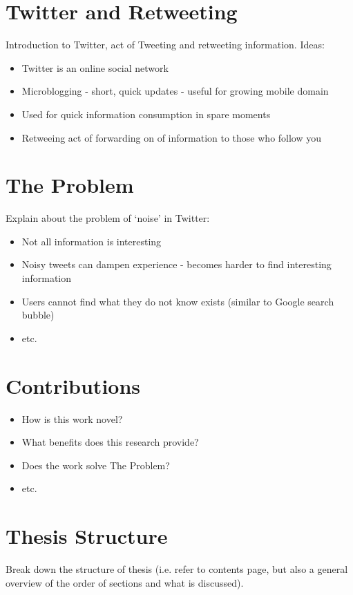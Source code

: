 \section{Twitter and Retweeting}
Introduction to Twitter, act of Tweeting and retweeting information. Ideas:
\begin{itemize}
\item Twitter is an online social network
\item Microblogging - short, quick updates - useful for growing mobile domain
\item Used for quick information consumption in spare moments
\item Retweeing act of forwarding on of information to those who follow you
\end{itemize}

\section{The Problem}
Explain about the problem of `noise' in Twitter:
\begin{itemize}
\item Not all information is interesting
\item Noisy tweets can dampen experience - becomes harder to find interesting information
\item Users cannot find what they do not know exists (similar to Google search bubble)
\item etc.
\end{itemize}

\section{Contributions}
\begin{itemize}
\item How is this work novel?
\item What benefits does this research provide?
\item Does the work solve The Problem? 
\item etc.
\end{itemize}
\section{Thesis Structure}
Break down the structure of thesis (i.e. refer to contents page, but also a general overview of the order of sections and what is discussed).

